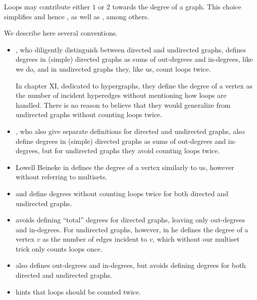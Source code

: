 \begin{remark}\label{rem:counting_loops_twice}
  Loops may contribute either \( 1 \) or \( 2 \) towards the degree of a graph. This choice simplifies  and hence , as well as , among others.

  We describe here several conventions.
  \begin{itemize}
    \item {}, who diligently distinguish between directed and undirected graphs, defines degrees in (simple) directed graphs as sums of out-degrees and in-degrees, like we do, and in undirected graphs they, like us, count loops twice.

    In chapter XI, dedicated to hypergraphs, they define the degree of a vertex as the number of incident hyperedges without mentioning how loops are handled. There is no reason to believe that they would generalize from undirected graphs without counting loops twice.

    \item {}, who also give separate definitions for directed and undirected graphs, also define degrees in (simple) directed graphs as sums of out-degrees and in-degrees, but for undirected graphs they avoid counting loops twice.

    \item Lowell Beineke in \cite[544]{Rosen1999DiscreteHandbook} defines the degree of a vertex similarly to us, however without referring to multisets.

    \item {} and  define degrees without counting loops twice for both directed and undirected graphs.

    \item {} avoids defining \enquote{total} degrees for directed graphs, leaving only out-degrees and in-degrees. For undirected graphs, however, in \cite[def. 1.1.8]{Knauer2011AlgGraphTheory} he defines the degree of a vertex \( v \) as the number of edges incident to \( v \), which without our multiset trick only counts loops once.

    \item {} also defines out-degrees and in-degrees, but avoids defining degrees for both directed and undirected graphs.

    \item {} hints that loops should be counted twice.
  \end{itemize}
\end{remark}

